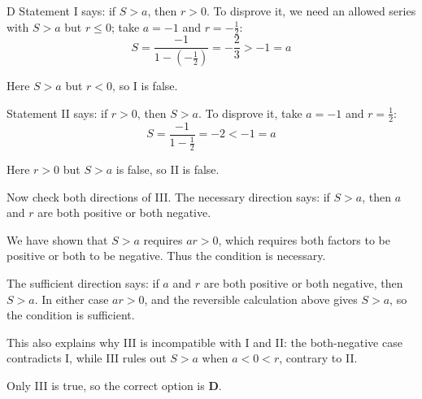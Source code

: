 \documentclass[11pt,a4paper]{article}
\begin{document}
\begin{enumerate}[label=\textbf{\arabic*.},leftmargin=*,itemsep=0pt,start=4]
\begin{djsSolution}{D}
Statement I says: if $S>a$, then $r>0$. To disprove it, we need an allowed series with $S>a$ but $r\leq0$; take $a=-1$ and $r=-\frac12$:
\[
S=\frac{-1}{1-(-\frac12)}=-\frac23>-1=a
\]

Here $S>a$ but $r<0$, so I is false.

Statement II says: if $r>0$, then $S>a$. To disprove it, take $a=-1$ and $r=\frac12$:
\[
S=\frac{-1}{1-\frac12}=-2<-1=a
\]

Here $r>0$ but $S>a$ is false, so II is false.

Now check both directions of III. The necessary direction says: if $S>a$, then $a$ and $r$ are both positive or both negative.

We have shown that $S>a$ requires $ar>0$, which requires both factors to be positive or both to be negative. Thus the condition is necessary.

The sufficient direction says: if $a$ and $r$ are both positive or both negative, then $S>a$. In either case $ar>0$, and the reversible calculation above gives $S>a$, so the condition is sufficient.

This also explains why III is incompatible with I and II: the both-negative case contradicts I, while III rules out $S>a$ when $a<0<r$, contrary to II.

Only III is true, so the correct option is \textbf{D}.
\end{djsSolution}
\end{enumerate}
\clearpage
\thispagestyle{djssolutions}
\vspace*{8pt}
\end{document}
